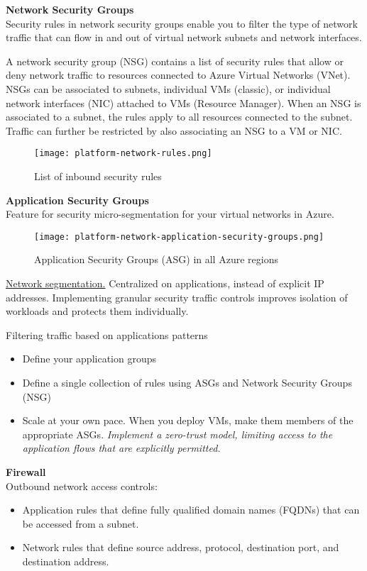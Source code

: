 \textbf{Network Security Groups} \\
Security rules in network security groups enable you to filter the type of network traffic that can flow in and out of virtual network subnets and network interfaces.

A network security group (NSG) contains a list of security rules that allow or deny network traffic to resources connected to Azure Virtual Networks (VNet). NSGs can be associated to subnets, individual VMs (classic), or individual network interfaces (NIC) attached to VMs (Resource Manager).  When an NSG is associated to a subnet, the rules apply to all resources connected to the subnet. Traffic can further be restricted by also associating an NSG to a VM or NIC.

\begin{figure}[!h]
\texttt{[image: platform-network-rules.png]}
\caption{List of inbound security rules}
\end{figure}


\textbf{Application Security Groups} \\
Feature for security micro-segmentation for your virtual networks in Azure.
\begin{figure}[!h]
\texttt{[image: platform-network-application-security-groups.png]}
\caption{Application Security Groups (ASG) in all Azure regions}
\end{figure}

\underline{Network segmentation.} Centralized on applications, instead of explicit IP addresses. Implementing granular security traffic controls improves isolation of workloads and protects them individually. 

Filtering traffic based on applications patterns
\begin{itemize}
\item Define your application groups
\item Define a single collection of rules using ASGs and Network Security Groups (NSG)
\item Scale at your own pace. When you deploy VMs, make them members of the appropriate ASGs. \textit{Implement a zero-trust model, limiting access to the application flows that are explicitly permitted.}
\end{itemize}

\textbf{Firewall} \\
Outbound network access controls:
\begin{itemize}
\item Application rules that define fully qualified domain names (FQDNs) that can be accessed from a subnet.
\item Network rules that define source address, protocol, destination port, and destination address.
\end{itemize}

